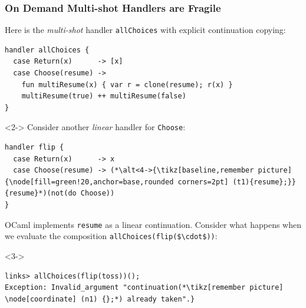 \documentclass[10pt,compress]{beamer}
\begin{document}
\begin{frame}[fragile]
  \frametitle{On Demand Multi-shot Handlers are Fragile} 
%
  Here is the \emph{multi-shot} handler \lstinline$allChoices$ with
  explicit continuation copying:
\begin{lstlisting}
handler allChoices {
  case Return(x)      -> [x]
  case Choose(resume) -> 
    fun multiResume(x) { var r = clone(resume); r(x) }     
    multiResume(true) ++ multiResume(false)
}    
\end{lstlisting}
%
\begin{uncoverenv}<2->
Consider another \emph{linear} handler for \lstinline$Choose$:
\begin{lstlisting}
handler flip {
  case Return(x)      -> x
  case Choose(resume) -> (*\alt<4->{\tikz[baseline,remember picture]{\node[fill=green!20,anchor=base,rounded corners=2pt] (t1){resume};}}{resume}*)(not(do Choose))
}    
\end{lstlisting}
OCaml implements \lstinline$resume$ as a linear continuation. Consider
what happens when we evaluate the composition
\lstinline[mathescape]!allChoices(flip($\cdot$))!:
\end{uncoverenv}
%
\begin{uncoverenv}<3->
\begin{lstlisting}
links> allChoices(flip(toss))();
Exception: Invalid_argument "continuation(*\tikz[remember picture] \node[coordinate] (n1) {};*) already taken".}
\end{lstlisting}
\end{uncoverenv}
%

%
\end{frame}
\end{document}
